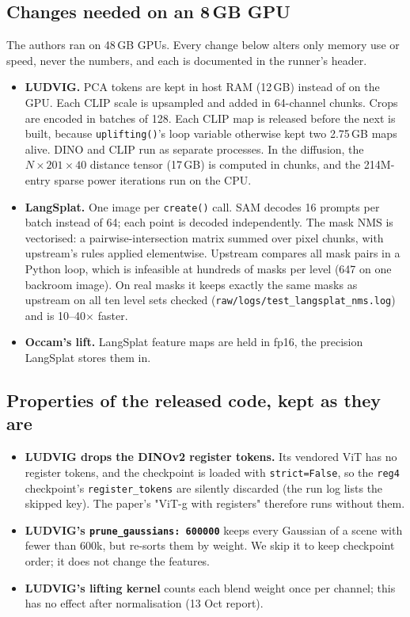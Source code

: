 \documentclass[11pt,a4paper]{article}
\newcommand{\code}[1]{\texttt{\small #1}}
\begin{document}
\subsection{Changes needed on an 8\,GB GPU}
The authors ran on 48\,GB GPUs. Every change below alters only memory use or speed, never the numbers, and each is
documented in the runner's header.
\begin{itemize}[leftmargin=*,itemsep=1pt]
  \item \textbf{LUDVIG.} PCA tokens are kept in host RAM (12\,GB) instead of on the GPU. Each CLIP scale is upsampled
        and added in 64-channel chunks. Crops are encoded in batches of 128. Each CLIP map is released before the next
        is built, because \code{uplifting()}'s loop variable otherwise kept two 2.75\,GB maps alive. DINO and CLIP run as
        separate processes. In the diffusion, the $N\times201\times40$ distance tensor (17\,GB) is computed in chunks,
        and the 214M-entry sparse power iterations run on the CPU.
  \item \textbf{LangSplat.} One image per \code{create()} call. SAM decodes 16 prompts per batch instead of 64; each point
        is decoded independently. The mask NMS is vectorised: a pairwise-intersection matrix summed over pixel chunks,
        with upstream's rules applied elementwise. Upstream compares all mask pairs in a Python loop, which is
        infeasible at hundreds of masks per level (647 on one backroom image). On real masks it keeps exactly the same masks as upstream on all
        ten level sets checked (\code{raw/logs/test\_langsplat\_nms.log}) and is 10--40$\times$ faster.
  \item \textbf{Occam's lift.} LangSplat feature maps are held in fp16, the precision LangSplat stores them in.
\end{itemize}

\subsection{Properties of the released code, kept as they are}
\begin{itemize}[leftmargin=*,itemsep=1pt]
  \item \textbf{LUDVIG drops the DINOv2 register tokens.} Its vendored ViT has no register tokens, and the checkpoint is
        loaded with \code{strict=False}, so the \code{reg4} checkpoint's \code{register\_tokens} are silently discarded
        (the run log lists the skipped key). The paper's "ViT-g with registers" therefore runs without them.
  \item \textbf{LUDVIG's \code{prune\_gaussians: 600000}} keeps every Gaussian of a scene with fewer than 600k, but
        re-sorts them by weight. We skip it to keep checkpoint order; it does not change the features.
  \item \textbf{LUDVIG's lifting kernel} counts each blend weight once per channel; this has no effect after normalisation
        (13 Oct report).
\end{itemize}
\end{document}
